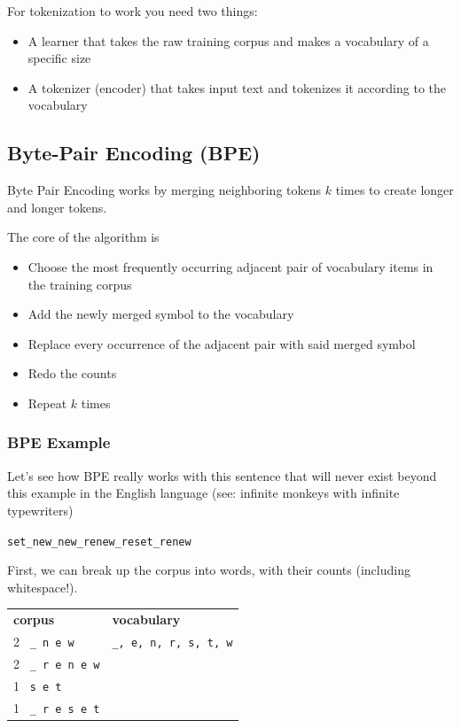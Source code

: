 \documentclass[11pt]{article}
\begin{document}
For tokenization to work you need two things:

\begin{itemize}
	\item A learner that takes the raw training corpus and makes a vocabulary of a
	      specific size
	\item A tokenizer (encoder) that takes input text and tokenizes it according
	      to the vocabulary
\end{itemize}

\subsection{Byte-Pair Encoding (BPE)}

Byte Pair Encoding works by merging neighboring tokens $k$ times to create
longer and longer tokens.

The core of the algorithm is

\begin{itemize}
	\item Choose the most frequently occurring adjacent pair of vocabulary items
	      in the training corpus
	\item Add the newly merged symbol to the vocabulary
	\item Replace every occurrence of the adjacent pair with said merged symbol
	\item Redo the counts
	\item Repeat $k$ times
\end{itemize}

\subsubsection*{BPE Example}

Let's see how BPE really works with this sentence that will never exist beyond
this example in the English language (see: infinite monkeys with infinite
typewriters)

\begin{center}
	\texttt{set\_new\_new\_renew\_reset\_renew}
\end{center}

First, we can break up the corpus into words, with their counts
(including whitespace!).

\begin{center}
	\begin{tabular}{ll}
		\textbf{corpus}           & \textbf{vocabulary}           \\
		2 \ \texttt{\_ n e w}     & \texttt{\_, e, n, r, s, t, w} \\
		2 \ \texttt{\_ r e n e w} &                               \\
		1 \ \texttt{s e t}        &                               \\
		1 \ \texttt{\_ r e s e t}
	\end{tabular}
\end{center}
\end{document}
